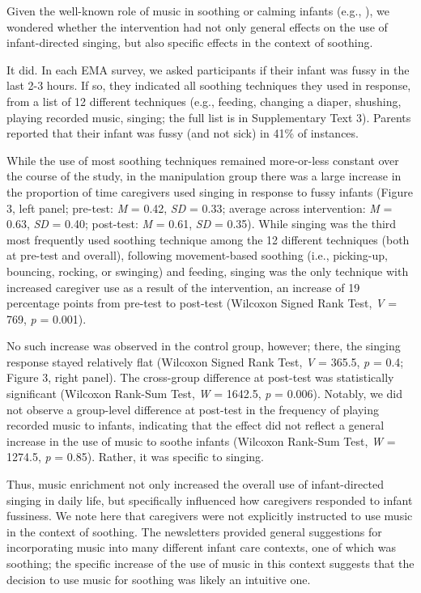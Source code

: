 \documentclass[
]{article}
\begin{document}
Given the well-known role of music in soothing or calming infants (e.g.,
), we wondered
whether the intervention had not only general effects on the use of
infant-directed singing, but also specific effects in the context of
soothing.

It did. In each EMA survey, we asked participants if their infant was
fussy in the last 2-3 hours. If so, they indicated all soothing
techniques they used in response, from a list of 12 different techniques
(e.g., feeding, changing a diaper, shushing, playing recorded music,
singing; the full list is in Supplementary Text 3). Parents reported
that their infant was fussy (and not sick) in 41\% of instances.

While the use of most soothing techniques remained more-or-less constant
over the course of the study, in the manipulation group there was a
large increase in the proportion of time caregivers used singing in
response to fussy infants (Figure 3, left panel; pre-test: \emph{M} =
0.42, \emph{SD} = 0.33; average across intervention: \emph{M} = 0.63,
\emph{SD} = 0.40; post-test: \emph{M} = 0.61, \emph{SD} = 0.35). While
singing was the third most frequently used soothing technique among the
12 different techniques (both at pre-test and overall), following
movement-based soothing (i.e., picking-up, bouncing, rocking, or
swinging) and feeding, singing was the only technique with increased
caregiver use as a result of the intervention, an increase of 19
percentage points from pre-test to post-test (Wilcoxon Signed Rank Test,
\emph{V} = 769, \emph{p} = 0.001).

No such increase was observed in the control group, however; there, the
singing response stayed relatively flat (Wilcoxon Signed Rank Test,
\emph{V} = 365.5, \emph{p} = 0.4; Figure 3, right panel). The
cross-group difference at post-test was statistically significant
(Wilcoxon Rank-Sum Test, \emph{W} = 1642.5, \emph{p} = 0.006). Notably,
we did not observe a group-level difference at post-test in the
frequency of playing recorded music to infants, indicating that the
effect did not reflect a general increase in the use of music to soothe
infants (Wilcoxon Rank-Sum Test, \emph{W} = 1274.5, \emph{p} = 0.85).
Rather, it was specific to singing.

Thus, music enrichment not only increased the overall use of
infant-directed singing in daily life, but specifically influenced how
caregivers responded to infant fussiness. We note here that caregivers
were not explicitly instructed to use music in the context of soothing.
The newsletters provided general suggestions for incorporating music
into many different infant care contexts, one of which was soothing; the
specific increase of the use of music in this context suggests that the
decision to use music for soothing was likely an intuitive one.
\end{document}
